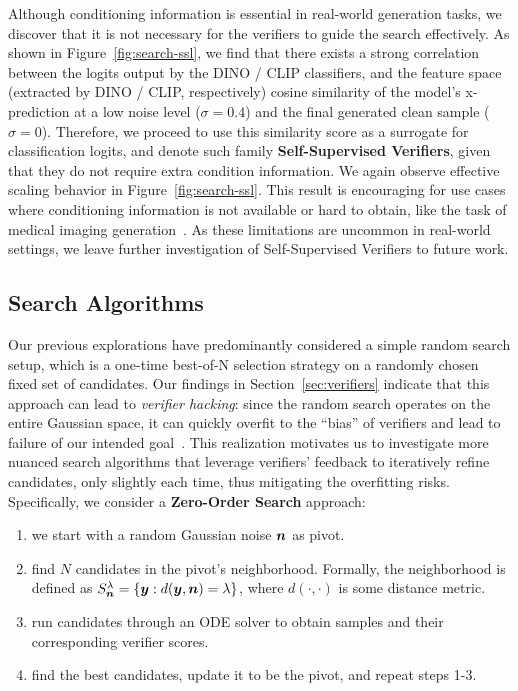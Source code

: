 Although conditioning information is essential in real-world generation tasks, we discover that it is not necessary for the verifiers to guide the search effectively. As shown in Figure~\ref{fig:search-ssl}, we find that there exists a strong correlation between the logits output by the DINO / CLIP classifiers, and the feature space (extracted by DINO / CLIP, respectively) cosine similarity of the model's x-prediction at a low noise level ($\sigma = 0.4$) and the final generated clean sample ($\sigma = 0$). Therefore, we proceed to use this similarity score as a surrogate for classification logits, and denote such family \textbf{Self-Supervised Verifiers}, given that they do not require extra condition information. We again observe effective scaling behavior in Figure~\ref{fig:search-ssl}. This result is encouraging for use cases where conditioning information is not available or hard to obtain, like the task of medical imaging generation~\citep{khader2022medical}. As these limitations are uncommon in real-world settings, we leave further investigation of Self-Supervised Verifiers to future work. 


\vspace{-0.2cm}
\subsection{Search Algorithms} 
\vspace{-0.2cm}
\label{sec:algorithm}


Our previous explorations have predominantly considered a simple random search setup, which is a one-time best-of-N selection strategy on a randomly chosen fixed set of candidates. Our findings in Section~\ref{sec:verifiers} indicate that this approach can lead to \textit{verifier hacking}: since the random search operates on the entire Gaussian space, it can quickly overfit to the ``bias'' of verifiers and lead to failure of our intended goal~\citep{gao2023scaling}. This realization motivates us to investigate more nuanced search algorithms that leverage verifiers' feedback to iteratively refine candidates, only slightly each time, thus mitigating the overfitting risks. Specifically, we consider a \textbf{Zero-Order Search} approach:


\begin{enumerate}
    \item we start with a random Gaussian noise $\boldsymbol{n}$ as pivot.
    \item find $N$ candidates in the pivot's neighborhood. Formally, the neighborhood is defined as $S_{\boldsymbol{n}}^\lambda = \{\boldsymbol{y}: d(\boldsymbol{y},\boldsymbol{n}) = \lambda\}$, where $d(\cdot, \cdot)$ is some distance metric.
    \item run candidates through an ODE solver to obtain samples and their corresponding verifier scores.
    \item find the best candidates, update it to be the pivot, and repeat steps 1-3.
\end{enumerate} 


